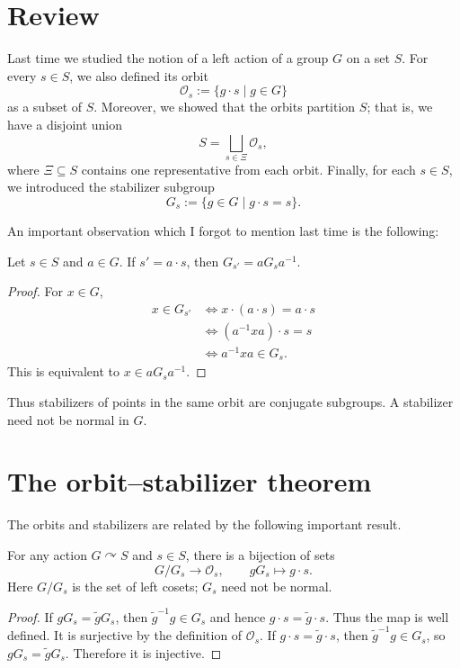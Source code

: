 \documentclass[reqno,11pt]{amsart}
\begin{document}
\raggedbottom
\makelecturetitle

\section{Review}

Last time we studied the notion of a left action of a group $G$ on a set $S$.
For every $s\in S$, we also defined its orbit
\begin{equation}\label{orbit}
  \mathcal O_s:=\{g\cdot s\mid g\in G\}
\end{equation}
as a subset of $S$. Moreover, we showed that the orbits partition $S$;
that is, we have a disjoint union
\[
  S=\bigsqcup_{s\in\Xi}\mathcal O_s,
\]
where $\Xi\subseteq S$ contains one representative from each orbit.
Finally, for each $s\in S$, we introduced the stabilizer subgroup
\begin{equation}\label{stab:s}
  G_s:=\{g\in G\mid g\cdot s=s\}.
\end{equation}

An important observation which I forgot to mention last time is the following:


\begin{lemma}\label{lem:conjugate-stabilizers}
Let $s\in S$ and $a\in G$. If $s'=a\cdot s$, then $G_{s'}=aG_sa^{-1}$.
\end{lemma}
\begin{proof}
For $x\in G$,
\begin{align*}
  x\in G_{s'}
  &\iff x\cdot(a\cdot s)=a\cdot s\\
  &\iff (a^{-1}xa)\cdot s=s\\
  &\iff a^{-1}xa\in G_s.
\end{align*}
This is equivalent to $x\in aG_sa^{-1}$.
\end{proof}

Thus stabilizers of points in the same orbit are conjugate subgroups.
A stabilizer need not be normal in $G$. 


\section{The orbit--stabilizer theorem}

The orbits and stabilizers are related by the following important result.


\begin{theorem}\label{thm:orbit-stabilizer}
For any action $G\curvearrowright S$ and $s\in S$, there is a
bijection of sets
\[
  G/G_s\longrightarrow\mathcal O_s,
  \qquad gG_s\longmapsto g\cdot s.
\]
Here $G/G_s$ is the set of left cosets; $G_s$ need not be normal.
\end{theorem}
\begin{proof}
If $gG_s=\widetilde gG_s$, then
$\widetilde g^{-1}g\in G_s$ and hence
$g\cdot s=\widetilde g\cdot s$. Thus the map is well defined.
It is surjective by the definition of $\mathcal O_s$.
If $g\cdot s=\widetilde g\cdot s$, then
$\widetilde g^{-1}g\in G_s$, so $gG_s=\widetilde gG_s$.
Therefore it is injective.
\end{proof}
\end{document}
